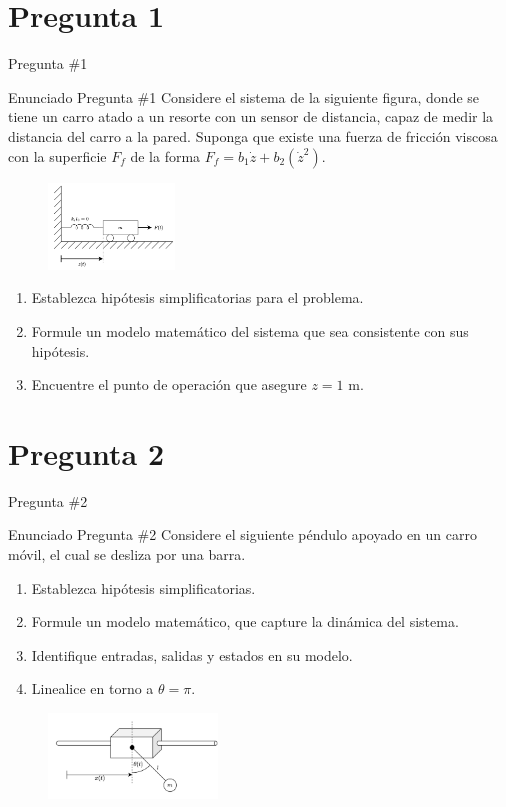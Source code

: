 \documentclass[
    10pt,
    aspectratio=169,
    xcolor={dvipsnames},
    spanish,
    ]{beamer}
\begin{document}
\section{Pregunta 1}
\begin{frame}{Pregunta \#1}
\begin{block}{Enunciado Pregunta \#1}
  \footnotesize
   Considere el sistema de la siguiente figura, donde se tiene un carro atado a un resorte con un sensor de distancia, capaz de medir la distancia del carro a la pared. Suponga que existe una fuerza de fricción viscosa con la superficie $F_f$ de la forma $F_f = b_1 \dot{z} + b_2 (\dot{z}^2)$.
    \begin{figure}[ht]
        \centering
        \includegraphics[width=0.3\textwidth]{Figura_2.pdf}
    \end{figure}
    \begin{enumerate}
        \item Establezca hipótesis simplificatorias para el problema.
        \item Formule un modelo matemático del sistema que sea consistente con sus hipótesis.
        \item Encuentre el punto de operación que asegure $z = 1$ m.
    \end{enumerate}
\end{block}
\end{frame}
\section{Pregunta 2}
\begin{frame}{Pregunta \#2}
  \begin{block}{Enunciado Pregunta \#2}
  Considere el siguiente péndulo apoyado en un carro móvil, el cual se desliza por una barra.
    \begin{enumerate}
        \item Establezca hipótesis simplificatorias.
        \item Formule un modelo matemático, que capture la dinámica del sistema.
        \item Identifique entradas, salidas y estados en su modelo.
        \item Linealice en torno a $\theta = \pi$.
    \end{enumerate}
    \begin{figure}[ht]
        \centering
        \includegraphics[width=0.4\textwidth]{Figura_3.pdf}
    \end{figure}
  \end{block}
\end{frame}
\end{document}
